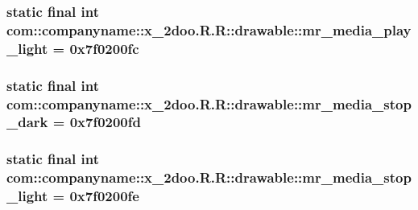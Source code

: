 \hypertarget{classcom_1_1companyname_1_1x__2doo_1_1_r_1_1drawable_190cc6b943efd6e53f8351926577c788}{
\subsubsection[{mr\_\-media\_\-play\_\-light}]{\setlength{\rightskip}{0pt plus 5cm}static final int com::companyname::x\_\-2doo.R.R::drawable::mr\_\-media\_\-play\_\-light = 0x7f0200fc}}
\label{classcom_1_1companyname_1_1x__2doo_1_1_r_1_1drawable_190cc6b943efd6e53f8351926577c788}


\hypertarget{classcom_1_1companyname_1_1x__2doo_1_1_r_1_1drawable_3e5949152417ec2c09444bd262af48a9}{
\subsubsection[{mr\_\-media\_\-stop\_\-dark}]{\setlength{\rightskip}{0pt plus 5cm}static final int com::companyname::x\_\-2doo.R.R::drawable::mr\_\-media\_\-stop\_\-dark = 0x7f0200fd}}
\label{classcom_1_1companyname_1_1x__2doo_1_1_r_1_1drawable_3e5949152417ec2c09444bd262af48a9}


\hypertarget{classcom_1_1companyname_1_1x__2doo_1_1_r_1_1drawable_9e534a834c019576e6c2c6d9890fdaab}{
\subsubsection[{mr\_\-media\_\-stop\_\-light}]{\setlength{\rightskip}{0pt plus 5cm}static final int com::companyname::x\_\-2doo.R.R::drawable::mr\_\-media\_\-stop\_\-light = 0x7f0200fe}}
\label{classcom_1_1companyname_1_1x__2doo_1_1_r_1_1drawable_9e534a834c019576e6c2c6d9890fdaab}


